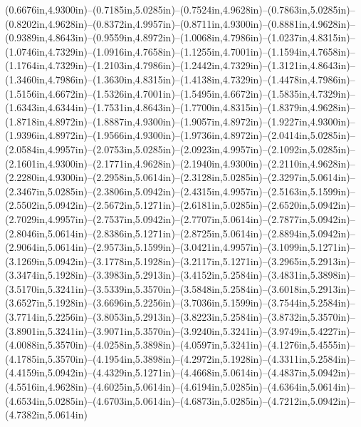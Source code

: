 (0.6676in,4.9300in)--(0.7185in,5.0285in)--(0.7524in,4.9628in)--(0.7863in,5.0285in)--(0.8202in,4.9628in)--(0.8372in,4.9957in)--(0.8711in,4.9300in)--(0.8881in,4.9628in)--(0.9389in,4.8643in)--(0.9559in,4.8972in)--(1.0068in,4.7986in)--(1.0237in,4.8315in)--(1.0746in,4.7329in)--(1.0916in,4.7658in)--(1.1255in,4.7001in)--(1.1594in,4.7658in)--(1.1764in,4.7329in)--(1.2103in,4.7986in)--(1.2442in,4.7329in)--(1.3121in,4.8643in)--(1.3460in,4.7986in)--(1.3630in,4.8315in)--(1.4138in,4.7329in)--(1.4478in,4.7986in)--(1.5156in,4.6672in)--(1.5326in,4.7001in)--(1.5495in,4.6672in)--(1.5835in,4.7329in)--(1.6343in,4.6344in)--(1.7531in,4.8643in)--(1.7700in,4.8315in)--(1.8379in,4.9628in)--(1.8718in,4.8972in)--(1.8887in,4.9300in)--(1.9057in,4.8972in)--(1.9227in,4.9300in)--(1.9396in,4.8972in)--(1.9566in,4.9300in)--(1.9736in,4.8972in)--(2.0414in,5.0285in)--(2.0584in,4.9957in)--(2.0753in,5.0285in)--(2.0923in,4.9957in)--(2.1092in,5.0285in)--(2.1601in,4.9300in)--(2.1771in,4.9628in)--(2.1940in,4.9300in)--(2.2110in,4.9628in)--(2.2280in,4.9300in)--(2.2958in,5.0614in)--(2.3128in,5.0285in)--(2.3297in,5.0614in)--(2.3467in,5.0285in)--(2.3806in,5.0942in)--(2.4315in,4.9957in)--(2.5163in,5.1599in)--(2.5502in,5.0942in)--(2.5672in,5.1271in)--(2.6181in,5.0285in)--(2.6520in,5.0942in)--(2.7029in,4.9957in)--(2.7537in,5.0942in)--(2.7707in,5.0614in)--(2.7877in,5.0942in)--(2.8046in,5.0614in)--(2.8386in,5.1271in)--(2.8725in,5.0614in)--(2.8894in,5.0942in)--(2.9064in,5.0614in)--(2.9573in,5.1599in)--(3.0421in,4.9957in)--(3.1099in,5.1271in)--(3.1269in,5.0942in)--(3.1778in,5.1928in)--(3.2117in,5.1271in)--(3.2965in,5.2913in)--(3.3474in,5.1928in)--(3.3983in,5.2913in)--(3.4152in,5.2584in)--(3.4831in,5.3898in)--(3.5170in,5.3241in)--(3.5339in,5.3570in)--(3.5848in,5.2584in)--(3.6018in,5.2913in)--(3.6527in,5.1928in)--(3.6696in,5.2256in)--(3.7036in,5.1599in)--(3.7544in,5.2584in)--(3.7714in,5.2256in)--(3.8053in,5.2913in)--(3.8223in,5.2584in)--(3.8732in,5.3570in)--(3.8901in,5.3241in)--(3.9071in,5.3570in)--(3.9240in,5.3241in)--(3.9749in,5.4227in)--(4.0088in,5.3570in)--(4.0258in,5.3898in)--(4.0597in,5.3241in)--(4.1276in,5.4555in)--(4.1785in,5.3570in)--(4.1954in,5.3898in)--(4.2972in,5.1928in)--(4.3311in,5.2584in)--(4.4159in,5.0942in)--(4.4329in,5.1271in)--(4.4668in,5.0614in)--(4.4837in,5.0942in)--(4.5516in,4.9628in)--(4.6025in,5.0614in)--(4.6194in,5.0285in)--(4.6364in,5.0614in)--(4.6534in,5.0285in)--(4.6703in,5.0614in)--(4.6873in,5.0285in)--(4.7212in,5.0942in)--(4.7382in,5.0614in) 